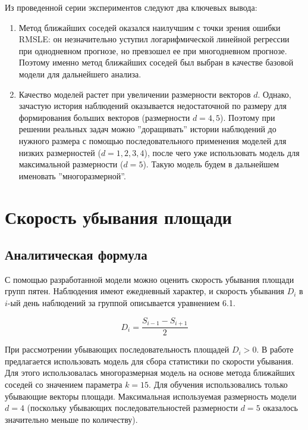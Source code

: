 \documentclass[a4paper, 12pt]{article}
\begin{document}
Из проведенной серии экспериментов следуют два ключевых вывода:

\begin{enumerate}
    \item Метод ближайших соседей оказался наилучшим с точки зрения ошибки RMSLE: он незначительно уступил логарифмической линейной регрессии при однодневном прогнозе, но превзошел ее при многодневном прогнозе. Поэтому именно метод ближайших соседей был выбран в качестве базовой модели для дальнейшего анализа.
    \item Качество моделей растет при увеличении размерности векторов $d$. Однако, зачастую история наблюдений оказывается недостаточной по размеру для формирования больших векторов (размерности $d=4, 5$). Поэтому при решении реальных задач можно ''доращивать'' истории наблюдений до нужного размера с помощью последовательного применения моделей для низких размерностей ($d=1, 2, 3, 4$), после чего уже использовать модель для максимальной размерности ($d=5$). Такую модель будем в дальнейшем именовать ''многоразмерной''.
\end{enumerate}

\section{Скорость убывания площади}

\subsection{Аналитическая формула}

С помощью разработанной модели можно оценить скорость убывания площади групп пятен. Наблюдения имеют ежедневный характер, и скорость убывания $D_i$ в $i$-ый день наблюдений за группой описывается уравнением 6.1.

\begin{equation}
    D_i = \frac{S_{i-1} - S_{i+1}}{2}
\end{equation}

При рассмотрении убывающих последовательность площадей $D_i > 0$. В работе предлагается использовать модель для сбора статистики по скорости убывания. Для этого использовалась многоразмерная модель на основе метода ближайших соседей со значением параметра $k=15$. Для обучения использовались только убывающие векторы площади. Максимальная используемая размерность модели $d=4$ (поскольку убывающих последовательностей размерности $d=5$ оказалось значительно меньше по количеству).
\end{document}
